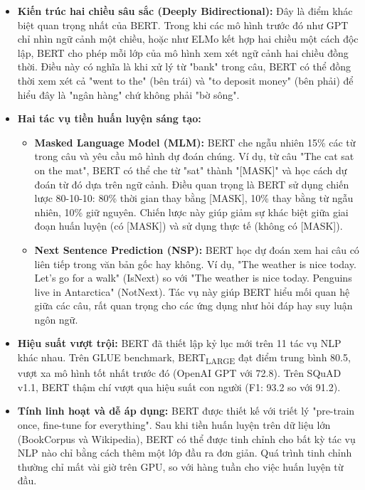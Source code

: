 \begin{itemize}
    \item \textbf{Kiến trúc hai chiều sâu sắc (Deeply Bidirectional):} Đây là điểm khác biệt quan trọng nhất của BERT. Trong khi các mô hình trước đó như GPT chỉ nhìn ngữ cảnh một chiều, hoặc như ELMo kết hợp hai chiều một cách độc lập, BERT cho phép mỗi lớp của mô hình xem xét ngữ cảnh hai chiều đồng thời. Điều này có nghĩa là khi xử lý từ "bank" trong câu, BERT có thể đồng thời xem xét cả "went to the" (bên trái) và "to deposit money" (bên phải) để hiểu đây là "ngân hàng" chứ không phải "bờ sông".
    
    \item \textbf{Hai tác vụ tiền huấn luyện sáng tạo:}
    \begin{itemize}
        \item \textbf{Masked Language Model (MLM):} BERT che ngẫu nhiên 15\% các từ trong câu và yêu cầu mô hình dự đoán chúng. Ví dụ, từ câu "The cat sat on the mat", BERT có thể che từ "sat" thành "[MASK]" và học cách dự đoán từ đó dựa trên ngữ cảnh. Điều quan trọng là BERT sử dụng chiến lược 80-10-10: 80\% thời gian thay bằng [MASK], 10\% thay bằng từ ngẫu nhiên, 10\% giữ nguyên. Chiến lược này giúp giảm sự khác biệt giữa giai đoạn huấn luyện (có [MASK]) và sử dụng thực tế (không có [MASK]).
        
        \item \textbf{Next Sentence Prediction (NSP):} BERT học dự đoán xem hai câu có liên tiếp trong văn bản gốc hay không. Ví dụ, "The weather is nice today. Let's go for a walk" (IsNext) so với "The weather is nice today. Penguins live in Antarctica" (NotNext). Tác vụ này giúp BERT hiểu mối quan hệ giữa các câu, rất quan trọng cho các ứng dụng như hỏi đáp hay suy luận ngôn ngữ.
    \end{itemize}
    
    \item \textbf{Hiệu suất vượt trội:} BERT đã thiết lập kỷ lục mới trên 11 tác vụ NLP khác nhau. Trên GLUE benchmark, BERT\textsubscript{LARGE} đạt điểm trung bình 80.5, vượt xa mô hình tốt nhất trước đó (OpenAI GPT với 72.8). Trên SQuAD v1.1, BERT thậm chí vượt qua hiệu suất con người (F1: 93.2 so với 91.2).
    
    \item \textbf{Tính linh hoạt và dễ áp dụng:} BERT được thiết kế với triết lý "pre-train once, fine-tune for everything". Sau khi tiền huấn luyện trên dữ liệu lớn (BookCorpus và Wikipedia), BERT có thể được tinh chỉnh cho bất kỳ tác vụ NLP nào chỉ bằng cách thêm một lớp đầu ra đơn giản. Quá trình tinh chỉnh thường chỉ mất vài giờ trên GPU, so với hàng tuần cho việc huấn luyện từ đầu.
\end{itemize}

